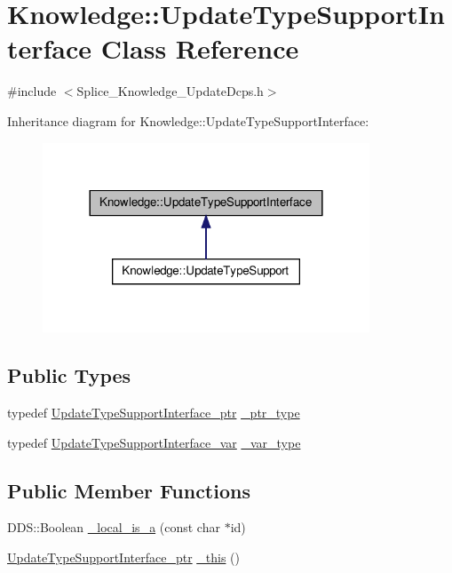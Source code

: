 \hypertarget{classKnowledge_1_1UpdateTypeSupportInterface}{
\section{Knowledge::UpdateTypeSupportInterface Class Reference}
\label{d6/d97/classKnowledge_1_1UpdateTypeSupportInterface}
}


{\ttfamily \#include $<$Splice\_\-Knowledge\_\-UpdateDcps.h$>$}



Inheritance diagram for Knowledge::UpdateTypeSupportInterface:
\nopagebreak
\begin{figure}[H]
\begin{center}
\leavevmode
\includegraphics[width=276pt]{d9/d3d/classKnowledge_1_1UpdateTypeSupportInterface__inherit__graph}
\end{center}
\end{figure}
\subsection*{Public Types}
\begin{DoxyCompactItemize}
\item 
typedef \hyperlink{classKnowledge_1_1UpdateTypeSupportInterface}{UpdateTypeSupportInterface\_\-ptr} \hyperlink{classKnowledge_1_1UpdateTypeSupportInterface_a35b969e998255d5c4a68cf2887debd92}{\_\-ptr\_\-type}
\item 
typedef \hyperlink{namespaceKnowledge_a933872871f686a514362b32892d09283}{UpdateTypeSupportInterface\_\-var} \hyperlink{classKnowledge_1_1UpdateTypeSupportInterface_afb29ad9f293bdad6236737eeb811774a}{\_\-var\_\-type}
\end{DoxyCompactItemize}
\subsection*{Public Member Functions}
\begin{DoxyCompactItemize}
\item 
DDS::Boolean \hyperlink{classKnowledge_1_1UpdateTypeSupportInterface_a1c30da427241d245b73d9f6d494a741f}{\_\-local\_\-is\_\-a} (const char $\ast$id)
\item 
\hyperlink{classKnowledge_1_1UpdateTypeSupportInterface}{UpdateTypeSupportInterface\_\-ptr} \hyperlink{classKnowledge_1_1UpdateTypeSupportInterface_ac4f8121e712162f36c9b614d96c342fa}{\_\-this} ()
\end{DoxyCompactItemize}
